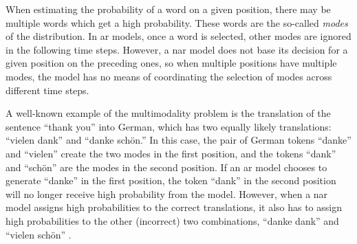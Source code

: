 When estimating the probability of a word on a given position, there may be
multiple words which get a high probability. These words are the so-called
\emph{modes} of the distribution. In \acl{ar} models, once a word is selected,
other modes are ignored in the following time steps. However, a \acl{nar} model
does not base its decision for a given position on the preceding ones, so when
multiple positions have multiple modes, the model has no means of coordinating
the selection of modes across different time steps.




A well-known example of the multimodality problem is the translation of the
sentence ``thank you'' into German, which has two equally likely translations:
``vielen dank'' and ``danke schön.'' In this case, the pair of German tokens
``danke'' and ``vielen'' create the two modes in the first position, and the
tokens ``dank'' and ``schön'' are the modes in the second position. If an
\acl{ar} model chooses to generate ``danke'' in the first position, the token
``dank'' in the second position will no longer receive high probability from
the model. However, when a \acl{nar} model assigns high probabilities to the
correct translations, it also has to assign high probabilities to the other
(incorrect) two combinations, ``danke dank'' and ``vielen schön''
\citep{gu2017nonautoregressive}.

